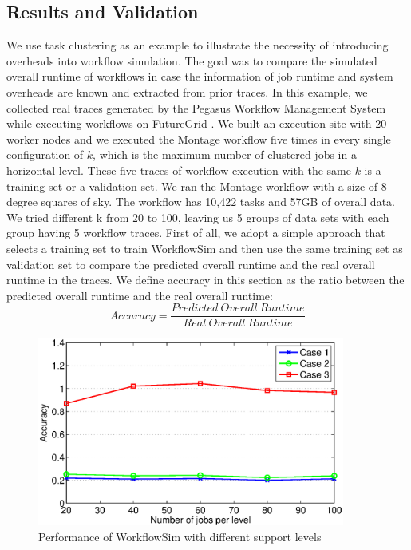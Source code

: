 \subsection{Results and Validation}
We use task clustering as an example to illustrate the necessity of introducing overheads into workflow simulation. The goal was to compare the simulated overall runtime of workflows in case the information of job runtime and system overheads are known and extracted from prior traces. 
In this example, we collected real traces generated by the Pegasus Workflow Management System while executing workflows on FutureGrid \cite{FutureGrid}. We built an execution site with 20 worker nodes and we executed the Montage workflow five times in every single configuration of $k$, which is the maximum number of clustered jobs in a horizontal level. These five traces of workflow execution with the same $k$ is a training set or a validation set. 
We ran the Montage workflow with a size of 8-degree squares of sky. The workflow has 10,422 tasks and 57GB of overall data. We tried different k from 20 to 100, leaving us 5 groups of data sets with each group having 5 workflow traces. 
First of all, we adopt a simple approach that selects a training set to train WorkflowSim and then use the same training set as validation set to compare the predicted overall runtime and the real overall runtime in the traces. We define accuracy in this section as the ratio between the predicted overall runtime and the real overall runtime:
\begin{equation} \label{eq:model_wfs_accuracy}
Accuracy=\frac{Predicted~Overall~Runtime}{Real~Overall~Runtime}
\end{equation}
 \begin{figure}[h!]
	\centering
    \includegraphics[width=0.9\textwidth]{figures/model/wfs_levels.eps}
    \caption{Performance of WorkflowSim with different support levels}
    \label{fig:model_wfs_levels}
\end{figure} 
 
